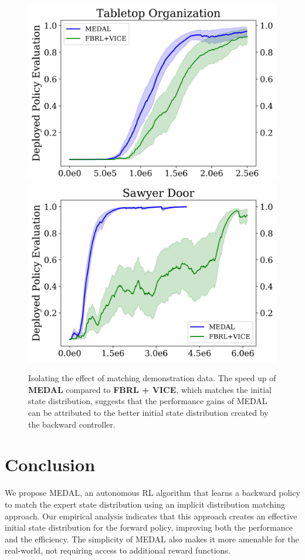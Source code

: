 \documentclass[nohyperref]{article}
\theoremstyle{plain}
\theoremstyle{definition}
\theoremstyle{remark}
\begin{document}
\begin{figure}[!h]
    \centering
    \includegraphics[width=0.8\columnwidth]{figures/fbrl_vice_tabletop_transfer.png}
    \includegraphics[width=0.8\columnwidth]{figures/fbrl_vice_door_transfer.png}
    \caption{Isolating the effect of matching demonstration data. The speed up of \textbf{MEDAL} compared to \textbf{FBRL + VICE}, which matches the initial state distribution, suggests that the performance gains of MEDAL can be attributed to the better initial state distribution created by the backward controller.}
    \label{fig:vice}
\end{figure}

\section{Conclusion}
We propose MEDAL, an autonomous RL algorithm that learns a backward policy to match the expert state distribution using an implicit distribution matching approach. Our empirical analysis indicates that this approach creates an effective initial state distribution for the forward policy, improving both the performance and the efficiency. The simplicity of MEDAL also makes it more amenable for the real-world, not requiring access to additional reward functions.
\end{document}
